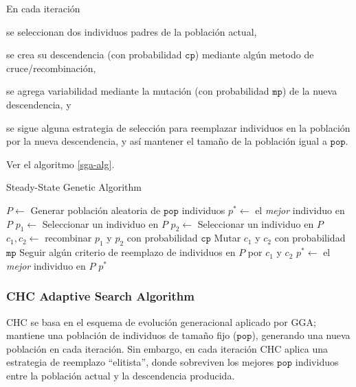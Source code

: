 En cada iteración
\begin{inparaenum}
\item se seleccionan dos individuos padres de la población actual,
\item se crea su descendencia (con probabilidad $\texttt{cp}$) mediante algún metodo de cruce/recombinación,
\item se agrega variabilidad mediante la mutación (con probabilidad $\texttt{mp}$) de la nueva descendencia, y
\item se sigue alguna estrategia de selección para reemplazar individuos en la población por la nueva descendencia, y así mantener el tamaño de la población igual a $\texttt{pop}$.
\end{inparaenum}
Ver el algoritmo \ref{sga-alg}.

\begin{algorithm}
\caption{Steady-State Genetic Algorithm}
\label{sga-alg}
\begin{algorithmic}[1]


\State $P \gets$ Generar población aleatoria de $\texttt{pop}$ individuos
\State $p^{*} \gets $ el \emph{mejor} individuo en $P$
	\State $p_1 \gets$ Seleccionar un individuo en $P$
	\State $p_2 \gets$ Seleccionar un individuo en $P$
	\State $c_1, c_2 \gets $ recombinar $p_1$ y $p_2$ con probabilidad $\texttt{cp}$
	\State Mutar $c_1$ y $c_2$ con probabilidad $\texttt{mp}$
	\State Seguir algún criterio de reemplazo de individuos en $P$ por $c_1$ y $c_2$
		\State $p^{*} \gets$ el \emph{mejor} individuo en $P$
	\EndIf
\EndWhile
\State \Return $p^{*}$

\end{algorithmic}
\end{algorithm}

\subsubsection{CHC Adaptive Search Algorithm}

CHC se basa en el esquema de evolución generacional aplicado por GGA; mantiene una población de individuos de tamaño fijo ($\texttt{pop}$), generando una nueva población en cada iteración. Sin embargo, en cada iteración CHC aplica una estrategia de reemplazo ``elitista'', donde sobreviven los mejores $\texttt{pop}$ individuos entre la población actual y la descendencia producida.

